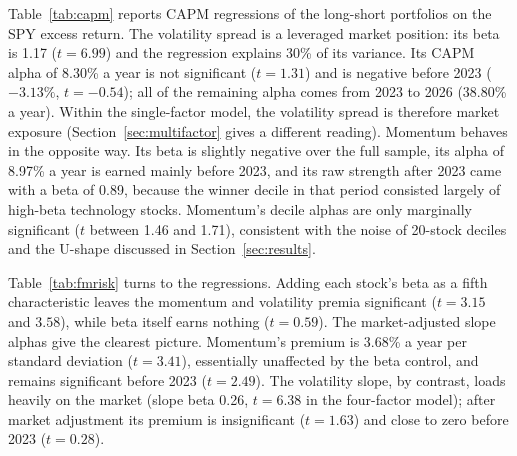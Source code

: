 \documentclass[11pt,a4paper]{article}
\newcommand{\tabfit}[1]{\resizebox{\textwidth}{!}{}}
\begin{document}
Table~\ref{tab:capm} reports CAPM regressions of the long-short portfolios on the SPY excess return. The volatility spread is a leveraged market position: its beta is 1.17 ($t = 6.99$) and the regression explains 30\% of its variance. Its CAPM alpha of 8.30\% a year is not significant ($t = 1.31$) and is negative before 2023 ($-3.13\%$, $t = -0.54$); all of the remaining alpha comes from 2023 to 2026 (38.80\% a year). Within the single-factor model, the volatility spread is therefore market exposure (Section~\ref{sec:multifactor} gives a different reading). Momentum behaves in the opposite way. Its beta is slightly negative over the full sample, its alpha of 8.97\% a year is earned mainly before 2023, and its raw strength after 2023 came with a beta of 0.89, because the winner decile in that period consisted largely of high-beta technology stocks. Momentum's decile alphas are only marginally significant ($t$ between 1.46 and 1.71), consistent with the noise of 20-stock deciles and the U-shape discussed in Section~\ref{sec:results}.

\begin{table}[!htbp]
\centering
\caption{CAPM regressions of long-short portfolios on the SPY excess return. Beta is from the full-sample gross regression. Alphas are annualised with Newey-West $t$-statistics (4 lags) in parentheses. Net alphas deduct 10 basis points per unit turnover.}
\label{tab:capm}
\small
\tabfit{tables/capm_alphas}
\end{table}

Table~\ref{tab:fmrisk} turns to the regressions. Adding each stock's beta as a fifth characteristic leaves the momentum and volatility premia significant ($t = 3.15$ and $3.58$), while beta itself earns nothing ($t = 0.59$). The market-adjusted slope alphas give the clearest picture. Momentum's premium is 3.68\% a year per standard deviation ($t = 3.41$), essentially unaffected by the beta control, and remains significant before 2023 ($t = 2.49$). The volatility slope, by contrast, loads heavily on the market (slope beta 0.26, $t = 6.38$ in the four-factor model); after market adjustment its premium is insignificant ($t = 1.63$) and close to zero before 2023 ($t = 0.28$).

\begin{table}[!htbp]
\centering
\caption{Fama-MacBeth regressions with trailing market beta as a control, and market-adjusted premia. The first two columns are mean monthly slopes from the five-characteristic model. The remaining columns are CAPM alphas of the monthly slope series (annualised, \% per one standard deviation), from the four-factor model of Table~\ref{tab:fm} and from the model with the beta control.}
\label{tab:fmrisk}
\small
\tabfit{tables/fm_risk}
\end{table}
\end{document}
